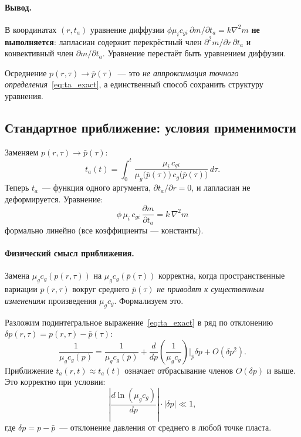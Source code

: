 \documentclass[12pt,a4paper]{article}
\begin{document}
\paragraph{Вывод.}
В координатах $(r,t_a)$ уравнение диффузии
$\phi\mu_ic_{gi}\,\partial m/\partial t_a = k\nabla^2 m$
\textbf{не выполняется}: лапласиан содержит перекрёстный
член $\partial^2 m/\partial r\,\partial t_a$ и
конвективный член $\partial m/\partial t_a$.
Уравнение перестаёт быть уравнением диффузии.

Осреднение $p(r,\tau) \to \bar{p}(\tau)$~--- это
\emph{не аппроксимация точного определения}~\eqref{eq:ta_exact},
а единственный способ сохранить структуру уравнения.

\subsection{Стандартное приближение: условия применимости}
\label{ssec:conditions_1ph}

Заменяем $p(r,\tau) \to \bar{p}(\tau)$:
\begin{equation}\label{eq:ta_std}
  t_a(t) = \int_0^t
  \frac{\mu_i\,c_{gi}}{\mu_g\bigl(\bar{p}(\tau)\bigr)\,
        c_g\bigl(\bar{p}(\tau)\bigr)}\,d\tau.
\end{equation}
Теперь $t_a$~--- функция одного аргумента,
$\partial t_a/\partial r = 0$, и лапласиан
не деформируется. Уравнение:
\begin{equation}\label{eq:gas_linear}
  \phi\,\mu_i\,c_{gi}\,\frac{\partial m}{\partial t_a}
  = k\,\nabla^2 m
\end{equation}
формально линейно (все коэффициенты --- константы).

\paragraph{Физический смысл приближения.}
Замена $\mu_g c_g(p(r,\tau))$ на $\mu_g c_g(\bar{p}(\tau))$
корректна, когда пространственные вариации $p(r,\tau)$
вокруг среднего $\bar{p}(\tau)$ \emph{не приводят к существенным
изменениям} произведения $\mu_g c_g$. Формализуем это.

Разложим подинтегральное выражение~\eqref{eq:ta_exact}
в ряд по отклонению $\delta p(r,\tau) = p(r,\tau) - \bar{p}(\tau)$:
\begin{equation}\label{eq:taylor_mu_c}
  \frac{1}{\mu_g c_g(p)} = \frac{1}{\mu_g c_g(\bar{p})}
  + \frac{d}{dp}\left(\frac{1}{\mu_g c_g}\right)\bigg|_{\bar{p}}
  \!\!\delta p + O(\delta p^2).
\end{equation}
Приближение $t_a(r,t) \approx t_a(t)$ означает отбрасывание
членов $O(\delta p)$ и выше. Это корректно при условии:
\begin{equation}\label{eq:criterion_1ph}
  \boxed{
  \left|\frac{d\ln(\mu_g c_g)}{dp}\right| \cdot |\delta p|
  \ll 1,}
\end{equation}
где $\delta p = p - \bar{p}$~--- отклонение давления
от среднего в любой точке пласта.
\end{document}
